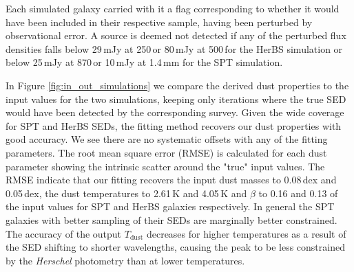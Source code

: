 Each simulated galaxy carried with it a flag corresponding to whether it would have been included in their respective sample, having been perturbed by observational error. A source is deemed not detected if any of the perturbed flux densities falls below 29\,mJy at 250\,\micron or 80\,mJy at 500\,\micron for the HerBS simulation or below 25\,mJy at 870\,\micron or 10\,mJy at 1.4\,mm for the SPT simulation.

In Figure \ref{fig:in_out_simulations} we compare the derived dust properties to the input values for the two simulations, keeping only iterations where the true SED would have been detected by the corresponding survey. Given the wide coverage for SPT and HerBS SEDs, the fitting method recovers our dust properties with good accuracy. We see there are no systematic offsets with any of the fitting parameters. The root mean square error (RMSE) is calculated for each dust parameter showing the intrinsic scatter around the "true" input values. The RMSE indicate that our fitting recovers the input dust masses to {\color{red} 0.08}\,dex and {\color{red}0.05}\,dex, the dust temperatures to {\color{red} 2.61}\,K and {\color{red} 4.05}\,K and $\beta$ to {\color{red} 0.16} and {\color{red} 0.13} of the input values for SPT and HerBS galaxies respectively. In general the SPT galaxies with better sampling of their SEDs are marginally better constrained. The accuracy of the output $T_{\textrm{dust}}$ decreases for higher temperatures as a result of the SED shifting to shorter wavelengths, causing the peak to be less constrained by the \textit{Herschel} photometry than at lower temperatures.

